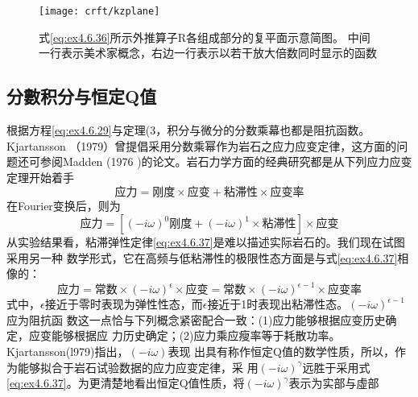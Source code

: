 \begin{figure}[H]
\centering
\texttt{[image: crft/kzplane]}
\caption[kzplane]{式\ref{eq:ex4.6.36}所示外推算子R各组成部分的复平面示意简图。
中间一行表示美术家概念，右边一行表示以若干放大倍数同时显示的函数}
\label{fig:crft/kzplane}
\end{figure}

\subsection{分數积分与恒定Q值}
\label{sec:4.6.9}

根据方程\ref{eq:ex4.6.29}与定理(3，积分与微分的分数乘幕也都是阻抗函数。Kjartansson
（1979）曾提倡采用分数乘幂作为岩石之应力应变定律，这方面的问题还可参阅Madden
(1976 )的论文。岩石力学方面的经典研究都是从下列应力应变定理开始着手
\begin{equation*}
\text{应力}=\text{刚度}\times\text{应变}+\text{粘滞性}\times\text{应变率}
\end{equation*}
在Fourier变换后，则为
\begin{equation}
\text{应力}=[(-i\omega)^0\text{刚度}+(-i\omega)^1\times\text{粘滞性}]\times\text{应变}
\label{eq:ex4.6.37}
\end{equation}
从实验结果看，粘滞弹性定律\ref{eq:ex4.6.37}是难以描述实际岩石的。我们现在试图采用另一种
数学形式，它在高频与低粘滞性的极限性态方面是与式\ref{eq:ex4.6.37}相像的：
\begin{subequations}
\begin{equation}
\text{应力}=\text{常数}\times(-i\omega)^\epsilon\times\text{应变}
\label{eq:ex4.6.38a}
\end{equation}
\begin{equation}
=\text{常数}\times(-i\omega)^{\epsilon-1}\times\text{应变率}
\label{eq:ex4.6.38b}
\end{equation}
\label{eq:ex4.6.38}
\end{subequations}
式中，$\epsilon$接近于零时表现为弹性性态，而$\epsilon$接近于1时表现出粘滞性态。$(-i\omega)^{\epsilon-1}$应为阻抗函
数这一点恰与下列概念紧密配合一致：(1)应力能够根据应变历史确定，应变能够根据应
力历史确定；(2)应力乘应瘦率等于耗散功率。Kjartansson(l979)指出，$(-i\omega)$表现
出具有称作恒定Q值的数学性质，所以，作为能够拟合于岩石试验数据的应力应变定律，采
用$(-i\omega)^\gamma$远胜于采用式\ref{eq:ex4.6.37}。为更清楚地看出恒定Q值性质，将$(-i\omega)^\gamma$表示为实部与虛部
